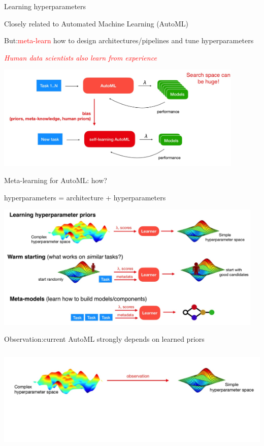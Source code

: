 \begin{frame}{Learning hyperparameters}
\centerline{Closely related to Automated Machine Learning (AutoML)}
\centerline{But:\textcolor{red}{meta-learn }how to design architectures/pipelines and tune hyperparameters}
\centerline{\textit{\textcolor{red}{Human data scientists also learn from experience}}}
\centering\includegraphics[height=5cm]{image/img195244.jpg}
\end{frame}


\begin{frame}{Meta-learning for AutoML: how?}
\small\centerline{hyperparameters = architecture + hyperparameters}


\centering\includegraphics[height=6cm]{image/img195525.jpg}

\end{frame}

\begin{frame}{Observation:}{current AutoML strongly depends on learned priors}

\centering\includegraphics[height=5cm]{image/img195740.jpg}

\end{frame}

